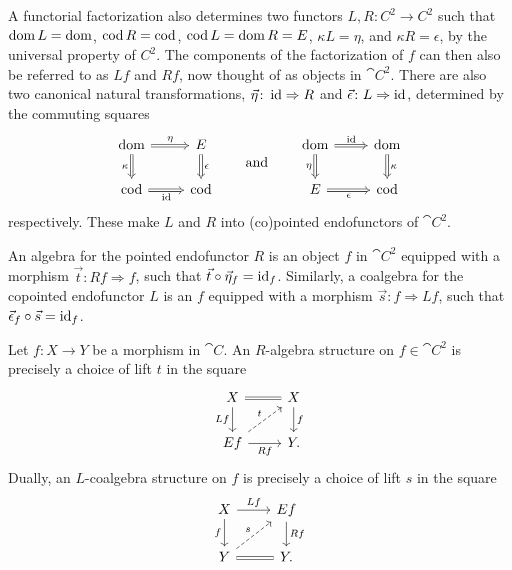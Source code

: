 A functorial factorization also determines two functors $L,R\colon C^2\to C^2$ such that $\operatorname{dom} L=\operatorname{dom}$, $\operatorname{cod} R=\operatorname{cod}$, $\operatorname{cod} L = \operatorname{dom} R = E$, $\kappa L = \eta$, and $\kappa R=\epsilon$, by the universal property of $C^2$. The components of the factorization of $f$ can then also be referred to as $Lf$ and $Rf$, now thought of as objects in $\cat{C}^2$. There are also two canonical natural transformations, $\vec{\eta}\colon \operatorname{id}\Rightarrow R$ and $\vec{\epsilon}\colon L\Rightarrow\operatorname{id}$, determined by the commuting squares
\[
\begin{tikzcd}[arrows=Rightarrow]
	\dom \rar{\eta} \dar[swap]{\kappa} & E \dar{\epsilon} \\
	\cod \rar[swap]{\id} & \cod
\end{tikzcd}
\qquad\text{and}\qquad
\begin{tikzcd}[arrows=Rightarrow]
	\dom \rar{\id} \dar[swap]{\eta} & \dom \dar{\kappa} \\
	E \rar[swap]{\epsilon} & \cod
\end{tikzcd}
\]
respectively. These make $L$ and $R$ into (co)pointed endofunctors of $\cat{C}^2$.

An algebra for the pointed endofunctor $R$ is an object $f$ in $\cat{C}^2$ equipped with a morphism $\vec{t}\colon Rf\Rightarrow f$, such that $\vec{t}\circ\vec{\eta}_f=\operatorname{id}_f$. Similarly, a coalgebra for the copointed endofunctor $L$ is an $f$ equipped with a morphism $\vec{s}\colon f\Rightarrow Lf$, such that $\vec{\epsilon}_f\circ\vec{s}=\operatorname{id}_f$.

\begin{lemma}
	Let $f\colon X\to Y$ be a morphism in $\cat{C}$. An $R$-algebra structure on $f\in\cat{C}^2$ is precisely a choice of lift $t$ in the square
	\begin{equation}\label{Eq:RAlg}
	\begin{tikzcd}
		X \rar[equals] \dar[swap]{Lf} & X \dar{f} \\
		Ef \rar[swap]{Rf} \urar[dashed]{t} & Y.
	\end{tikzcd}
	\end{equation}
	Dually, an $L$-coalgebra structure on $f$ is precisely a choice of lift $s$ in the square
	\begin{equation}\label{Eq:LAlg}
	\begin{tikzcd}
		X \rar{Lf} \dar[swap]{f} & Ef \dar{Rf} \\
		Y \rar[equals] \urar[dashed]{s} & Y.
	\end{tikzcd}
	\end{equation}
\end{lemma}

